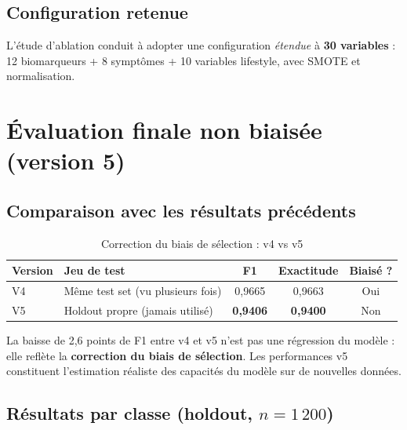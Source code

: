 \documentclass[12pt,a4paper]{article}
\begin{document}
\subsection{Configuration retenue}

L'étude d'ablation conduit à adopter une configuration \emph{étendue} à
\textbf{30 variables} : 12 biomarqueurs + 8 symptômes + 10 variables lifestyle,
avec SMOTE et normalisation.

\section{Évaluation finale non biaisée (version 5)}

\subsection{Comparaison avec les résultats précédents}

\begin{table}[H]
\centering
\caption{Correction du biais de sélection : v4 vs v5}
\label{tab:v4v5}
\begin{tabular}{llccc}
\toprule
\textbf{Version} & \textbf{Jeu de test} & \textbf{F1} & \textbf{Exactitude}
    & \textbf{Biaisé ?} \\
\midrule
V4 & Même test set (vu plusieurs fois) & 0,9665 & 0,9663 & \textcolor{rouge}{Oui} \\
\rowcolor{vert!10}
V5 & Holdout propre (jamais utilisé)   & \textbf{0,9406} & \textbf{0,9400}
    & \textcolor{vert}{Non} \\
\bottomrule
\end{tabular}
\end{table}

La baisse de 2,6 points de F1 entre v4 et v5 n'est pas une régression du modèle :
elle reflète la \textbf{correction du biais de sélection}. Les performances v5
constituent l'estimation réaliste des capacités du modèle sur de nouvelles données.

\subsection{Résultats par classe (holdout, $n = 1\,200$)}
\end{document}
